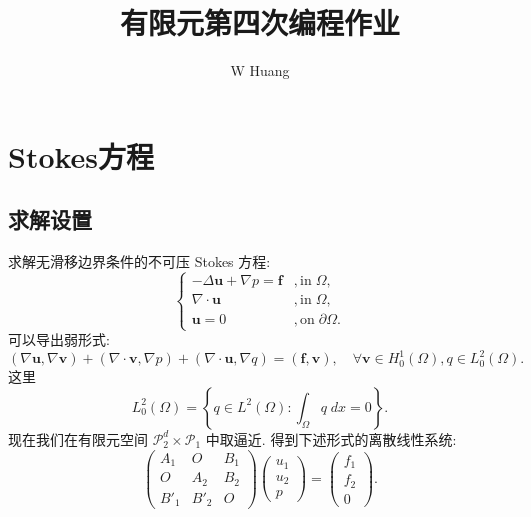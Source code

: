 \documentclass[lang=cn,11pt,a4paper]{elegantpaper}
\title{有限元第四次编程作业}
\author{W Huang}
\date{\zhtoday}
\begin{document}
\maketitle

\section{Stokes方程}

\subsection{求解设置}

求解无滑移边界条件的不可压 Stokes 方程: 
\begin{equation}
    \left\{
        \begin{array}{ll}
            -\Delta \mathbf{u}+\nabla p = \mathbf{f}& ,\text{in}\;\Omega,\\
            \nabla\cdot \mathbf{u}& ,\text{in}\;\Omega,\\
            \mathbf{u} = 0& ,\text{on}\;\partial \Omega.
        \end{array}
    \right.
\end{equation}
可以导出弱形式: 
\begin{equation}
    (\nabla \mathbf{u},\nabla \mathbf{v}) 
    + (\nabla\cdot \mathbf{v},\nabla p)
    + (\nabla\cdot \mathbf{u},\nabla q)
    = (\mathbf{f},\mathbf{v}),\quad \forall \mathbf{v}\in H_0^1(\Omega),q\in L_0^2(\Omega).
\end{equation}
这里
\begin{equation}
    L_0^2(\Omega)=\left\{q\in L^2(\Omega):\int_\Omega q\;dx=0\right\}.
\end{equation}
现在我们在有限元空间 $\mathcal{P}_2^d\times \mathcal{P}_1$ 中取逼近. 
得到下述形式的离散线性系统:
\begin{equation}
    \begin{pmatrix}
        A_1 & O & B_1 \\
        O & A_2 & B_2 \\
        B'_1 & B'_2 & O
    \end{pmatrix}
    \begin{pmatrix}
        u_1\\
        u_2\\
        p
    \end{pmatrix}
    =
    \begin{pmatrix}
        f_1\\
        f_2\\
        0
    \end{pmatrix}.
\end{equation}
\end{document}
